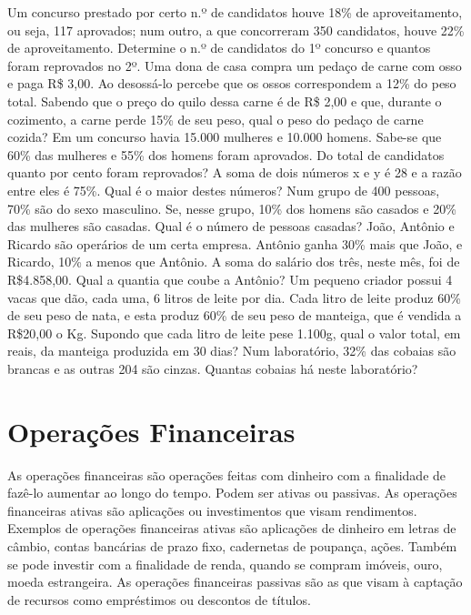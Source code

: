 \begin{exercicios}
    	\exitem{} Um concurso prestado por certo n.º de candidatos houve 18\% de aproveitamento, ou seja, 117 aprovados; num outro, a que concorreram 350 candidatos, houve 22\% de aproveitamento. Determine o n.º de candidatos do 1º concurso e quantos foram reprovados no 2º.
    	\exitem{} Uma dona de casa compra um pedaço de carne com osso e paga R\$ 3,00. Ao desossá-lo percebe que os ossos correspondem a 12\% do peso total. Sabendo que o preço do quilo dessa carne é de R\$ 2,00 e que, durante o cozimento, a carne perde 15\% de seu peso, qual o peso do pedaço de carne  cozida?
        \exitem{} Em um concurso havia 15.000 mulheres e 10.000 homens. Sabe-se que 60\% das mulheres e 55\% dos homens foram aprovados. Do total de candidatos quanto por cento foram reprovados?
        \exitem{} A soma de dois números x e y é 28 e a razão entre eles é 75\%. Qual é o maior destes números?
        \exitem{} Num grupo de 400 pessoas, 70\% são do sexo masculino. Se, nesse grupo, 10\% dos homens são casados e 20\% das mulheres são casadas. Qual é o número de pessoas casadas?
        \exitem{} João, Antônio e Ricardo são operários de um certa empresa. Antônio ganha 30\% mais que João, e Ricardo, 10\% a menos que Antônio. A soma do salário dos três, neste mês, foi de R\$4.858,00. Qual a quantia que coube a Antônio?
        \exitem{} Um pequeno criador possui 4 vacas que dão, cada uma, 6 litros de leite por dia. Cada litro de leite produz 60\% de seu peso de nata, e esta produz 60\% de seu peso de manteiga, que é vendida a R\$20,00 o Kg. Supondo que cada litro de leite pese 1.100g, qual o valor total, em reais, da manteiga produzida em 30 dias?
        \exitem{}  Num laboratório, 32\% das cobaias são brancas e as outras 204 são cinzas. Quantas cobaias há neste laboratório? 
\end{exercicios}

\section{Operações Financeiras}

	As operações financeiras são operações feitas com dinheiro com a finalidade de fazê-lo aumentar ao longo do tempo. Podem ser ativas ou passivas. As operações financeiras ativas são aplicações ou investimentos que visam rendimentos. Exemplos de operações financeiras ativas são aplicações de dinheiro em letras de câmbio, contas bancárias de prazo fixo, cadernetas de poupança, ações. Também se pode investir com a finalidade de renda, quando se compram imóveis, ouro, moeda estrangeira. As operações financeiras passivas são as que visam à captação de recursos como empréstimos ou descontos de títulos. 

